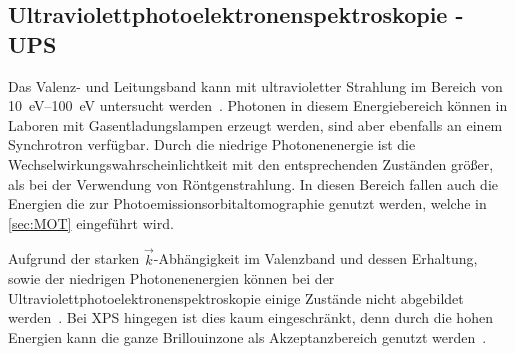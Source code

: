         

        \subsection{Ultraviolettphotoelektronenspektroskopie - UPS} \label{sec:UPS}
            Das Valenz- und Leitungsband kann mit ultravioletter Strahlung im Bereich von \SIrange{10}{100}{\electronvolt} untersucht werden~\cite{Fauster}.
            Photonen in diesem Energiebereich können in Laboren mit Gasentladungslampen erzeugt werden, sind aber ebenfalls an einem Synchrotron verfügbar.
            Durch die niedrige Photonenenergie ist die Wechselwirkungswahrscheinlichtkeit mit den entsprechenden Zuständen größer, als bei der Verwendung von Röntgenstrahlung.
            In diesen Bereich fallen auch die Energien die zur Photoemissionsorbitaltomographie genutzt werden, welche in \autoref{sec:MOT} eingeführt wird.

            Aufgrund der starken $\vec{k}$-Abhängigkeit im Valenzband und dessen Erhaltung, sowie der niedrigen Photonenenergien können bei der Ultraviolettphotoelektronenspektroskopie einige Zustände nicht abgebildet werden~\cite{Hüfner}.
            Bei XPS hingegen ist dies kaum eingeschränkt, denn durch die hohen Energien kann die ganze Brillouinzone als Akzeptanzbereich genutzt werden~\cite{Hüfner}.


